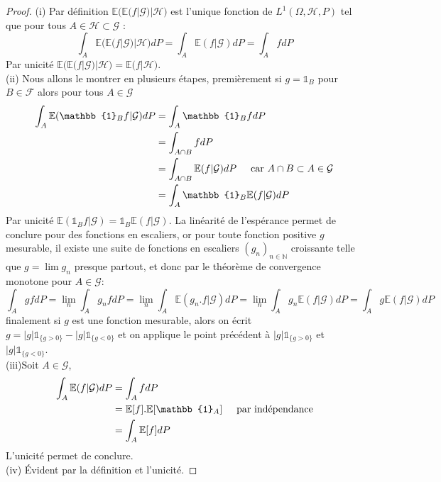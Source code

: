 \documentclass[12pt]{article}
\theoremstyle{definition}
\begin{document}
\begin{proof}
	(i) Par définition $\mathbb{E}\Big(\mathbb{E}(f|\mathcal{G})|\mathcal{H}\Big)$ est l'unique fonction de $L^1(\Omega,\mathcal{H},P)$ tel que pour tous $A\in\mathcal{H}\subset\mathcal{G}$ :
	\begin{equation*}
		\int_{A}\mathbb{E}\Big(\mathbb{E}(f|\mathcal{G})|\mathcal{H}\Big)dP = \int_{A}\mathbb{E}(f|\mathcal{G})dP= \int_{A}f dP
	\end{equation*}
	Par unicité $\mathbb{E}\Big(\mathbb{E}(f|\mathcal{G})|\mathcal{H}\Big)=\mathbb{E}\Big(f|\mathcal{H}\Big)$.\\
	(ii) Nous allons le montrer en plusieurs étapes, premièrement si $g=\mathbb{1}_{B}$ pour $B\in\mathcal{F}$ alors pour tous $A\in \mathcal{G}$ 
	\begin{align*}
		\int_{A}\mathbb{E}(\mathbb{1}_{B}f|\mathcal{G})dP&=\int_A \mathbb{1}_B f dP\\
		&=\int_{A\cap B} f dP\\
		&=\int_{A\cap B} \mathbb{E}(f|\mathcal{G})dP \hspace{5mm} \text{car $A\cap B \subset A\in\mathcal{G}$}\\
		&=\int_{A} \mathbb{1}_B \mathbb{E}(f|\mathcal{G})dP\\
	\end{align*}
	Par unicité $\mathbb{E}(\mathbb{1}_{B}f|\mathcal{G}) = \mathbb{1}_B \mathbb{E}(f|\mathcal{G})$. La linéarité de l'espérance  permet de conclure pour des fonctions en escaliers, or pour toute fonction positive $g$ mesurable, il existe une suite de fonctions en escaliers $(g_n)_{n\in\mathbb{N}}$ croissante telle que $g=\lim g_n$ presque partout, et donc par le théorème de convergence monotone pour $A\in\mathcal{G}$:
	\begin{equation*}
		\int_{A}gfdP=\lim_{n}\int_{A}g_nfdP=\lim_{n}\int_{A}\mathbb{E}(g_n.f|\mathcal{G})dP=\lim_{n}\int_{A}g_n\mathbb{E}(f|\mathcal{G}) dP =\int_{A}g\mathbb{E}(f|\mathcal{G})dP
	\end{equation*}
	finalement si $g$ est une fonction mesurable, alors on écrit $g = |g|\mathbb{1}_{\big\{g>0\big\}}-|g|\mathbb{1}_{\big\{g<0\big\}}$ et on applique le point précédent à $|g|\mathbb{1}_{\big\{g>0\big\}}$ et $|g|\mathbb{1}_{\big\{g<0\big\}}$.\\
	(iii)Soit $A\in \mathcal{G}$, 
	\begin{align*}
		\int_{A}\mathbb{E}(f|\mathcal{G})dP &= \int_{A}f dP\\
		&=\mathbb{E}[f]. \mathbb{E}[\mathbb{1}_{A}]\hspace{5mm}\text{par indépendance}\\
		&=\int_A \mathbb{E}[f] dP
	\end{align*}
	L'unicité permet de conclure.\\
	(iv)  Évident par la définition et l'unicité.
	\end{proof}
\end{document}
